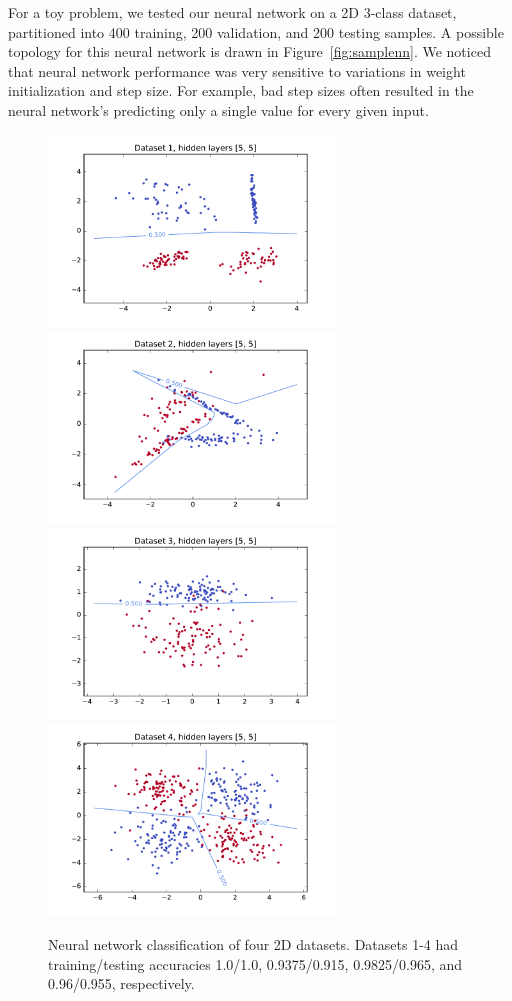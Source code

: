 \documentclass{article}
\begin{document}
\begin{multicols}{2}
For a toy problem, we tested our neural network on a 2D 3-class dataset,
partitioned into 400 training, 200 validation, and 200 testing samples.
A possible topology for this neural network is drawn in Figure~\ref{fig:samplenn}.
We noticed that neural network performance was very sensitive to 
variations in weight initialization and step size.
For example, bad step sizes often resulted in
the neural network's predicting only a single value for every given input.

\begin{figure}
   \centering
   \includegraphics[width=3in]{img/p1/1-200of200.pdf}\hspace{-.25in}
   \includegraphics[width=3in]{img/p1/2-183of200.pdf}
   \includegraphics[width=3in]{img/p1/3-192of200.pdf}\hspace{-.25in}
   \includegraphics[width=3in]{img/p1/4-382of400.pdf}
   \caption{Neural network classification of four 2D datasets.
   Datasets 1-4 had training/testing accuracies 1.0/1.0, 0.9375/0.915, 0.9825/0.965, and 0.96/0.955,
   respectively.
   }
   \label{fig:1-2-classify}
\end{figure}


\end{multicols}
\end{document}
